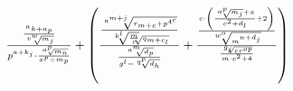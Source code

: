 \documentclass[10pt]{article}
\author{Zovits Bence}
\begin{document}
\begin{math}
$$\frac{\frac{^ak+a_p}{\sqrt[v^w]{m_j}}}{p^{a+k_j}\cdot\frac{\sqrt[a^p]{m_n}}{x^p\div m_p}}+
\left(\frac{\frac{\sqrt[a^{m+j}]{r_{m+c}+p^{4^c}}}
{\sqrt[{\sqrt[k^l]{\frac{m}{c}}}]{q_{m+c_l}}}}
{\frac{\sqrt[a^m]{d_p}}{g^l-\sqrt[q^p]{d_h}}}+
\frac{\frac{c\cdot\left(\frac{\sqrt[a^p]{m_j}+x}{c^2+d_l}+2\right)}{\sqrt[w^o]{m^{n+d_j}}}}{\frac{\sqrt[g_j]{er^{op}}}{m\cdot c^2+4}}\right) $$
\end{math}
\end{document}
